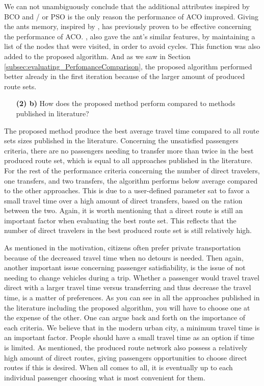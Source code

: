 We can not unambiguously conclude that the additional attributes inspired by BCO and / or PSO is the only reason the performance of ACO improved. Giving the ants memory, inspired by \citet{dorigo96}, has previously proven to be effective concerning the performance of ACO. \citet{sedighpour14}, \citet{poorzahedy11} \citet{salehinejad10} also gave the ant's similar features, by maintaining a list of the nodes that were visited, in order to avoid cycles. This function was also added to the proposed algorithm. And as we saw in Section \vref{subsec:evaluating_PerfomanceComparison}, the proposed algorithm performed better already in the first iteration because of the larger amount of produced route sets.

\begin{itemize}
\item[\textbf{(2) b)}] How does the proposed method perform compared to methods published in literature?
\end{itemize}

The proposed method produce the best average travel time compared to all route sets sizes published in the literature. Concerning the unsatisfied passengers criteria, there are no passengers needing to transfer more than twice in the best produced route set, which is equal to all approaches published in the literature. For the rest of the performance criteria concerning the number of direct travelers, one transfers, and two transfers, the algorithm performs below average compared to the other approaches. This is due to a user-defined parameter sat to favor a small travel time over a high amount of direct transfers, based on the ration between the two. Again, it is worth mentioning that a direct route is still an important factor when evaluating the best route set. This reflects that the number of direct travelers in the best produced route set is still relatively high.

As mentioned in the motivation, citizens often prefer private transportation because of the decreased travel time when no detours is needed. Then again, another important issue concerning passenger satisfiability, is the issue of not needing to change vehicles during a trip. Whether a passenger would travel travel direct with a larger travel time versus transferring and thus decrease the travel time, is a matter of preferences. As you can see in all the approaches published in the literature including the proposed algorithm, you will have to choose one at the expense of the other. One can argue back and forth on the importance of each criteria. We believe that in the modern urban city, a minimum travel time is an important factor. People should have a small travel time as an option if time is limited. As mentioned, the produced route network also possess a relatively high amount of direct routes, giving passengers opportunities to choose direct routes if this is desired. %
When all comes to all, it is eventually up to each individual passenger choosing what is most convenient for them. 
